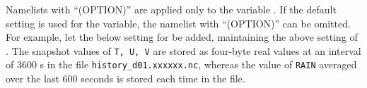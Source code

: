 Namelists with ``(OPTION)'' are applied only to the variable . If the default setting is used for the variable, the namelist with ``(OPTION)'' can be omitted. For example, let the below setting for  be added, maintaining the above setting of . The snapshot values of \verb|T, U, V| are stored as four-byte real values at an interval of 3600 s in the file \verb|history_d01.xxxxxx.nc|, whereas the value of \verb|RAIN| averaged over the last 600 seconds is stored each time in the file. 

